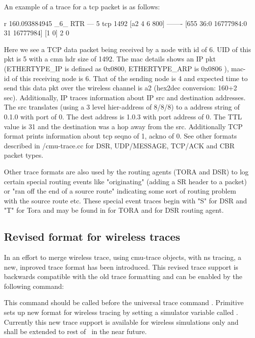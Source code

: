 An example of a trace for a tcp packet is as follows:
\begin{program}
r 160.093884945 _6_ RTR  --- 5 tcp 1492 [a2 4 6 800] ------- [655
36:0 16777984:0 31 16777984] [1 0] 2 0
\end{program}
Here we see a TCP data packet being received by a node with id of 6. UID
of this pkt is 5 with a cmn hdr size of 1492. The mac details shows an IP
pkt (ETHERTYPE\_IP is defined as 0x0800, ETHERTYPE\_ARP is 0x0806 ), mac-id
of this receiving node is 6. That of the sending node is 4 and expected
time to send this data pkt over the wireless channel is a2 (hex2dec
conversion: 160+2 sec). Additionally, IP traces information about IP src
and destination addresses. The src translates (using a 3 level
hier-address of 8/8/8) to a address string of 0.1.0 with port of 0. The
dest address is 1.0.3 with port address of 0. The TTL value is 31 and the
destination was a hop away from the src. Additionally TCP format prints
information about tcp seqno of 1, ackno of 0. See other formats described
in \nsf/cmu-trace.cc for DSR, UDP/MESSAGE, TCP/ACK and CBR packet types.

Other trace formats are also used by the routing agents (TORA and DSR) to
log certain special routing events like "originating" (adding a SR header
to a packet) or  "ran off the end of a source route" indicating some sort
of routing problem with the source route etc. These special event traces
begin with "S" for DSR and "T" for Tora and may
be found in  for TORA and  for DSR
routing agent.


\subsection{Revised format for wireless traces}
\label{sec:revtraceformat}

In an effort to merge wireless trace, using cmu-trace objects, with
ns tracing, a new, inproved trace format has been introduced. This revised
trace support is backwards compatible with the old trace formatting and
can be enabled by the following command:
This command should be called before the universal trace command
. Primitive  sets up new
format for wireless tracing by setting a simulator variable called
. Currently this new trace support is available for
wireless simulations only and shall be extended to rest of \ns\ in the near
future.

